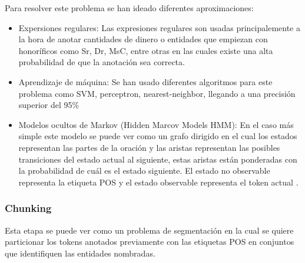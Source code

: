 \documentclass[runningheads]{llncs}
\begin{document}
Para resolver este problema se han ideado diferentes aproximaciones:

\begin{itemize}

\item Expersiones regulares: Las expresiones regulares son usadas principalemente a la hora de anotar cantidades de dinero o entidades que empiezan con honoríficos como Sr, Dr, MsC, entre otras en las cuales existe una alta probabilidad de que la anotación sea correcta.

\item Aprendizaje de máquina: Se han usado diferentes algoritmos para este problema como SVM, perceptron, nearest-neighbor, llegando a una precisión superior del 95\% \cite{postag}

\item Modelos ocultos de Markov (Hidden Marcov Models HMM): En el caso más simple este modelo se puede ver como un grafo dirigido en el cual los estados representan las partes de la oración y las aristas representan las posibles transiciones del estado actual al siguiente, estas aristas están ponderadas con la probabilidad de cuál es el estado siguiente. El estado no observable representa la etiqueta POS y el estado observable representa el token actual \cite{hmm}.

\end{itemize}

\subsubsection{Chunking}

%


Esta etapa se puede ver como un problema de segmentación en la cual se quiere particionar los tokens anotados previamente con las etiquetas POS en conjuntos que identifiquen las entidades nombradas.
\end{document}
